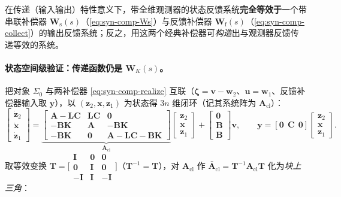 \begin{theorem}
\label{thm:syn-compensator-equiv}
在传递（输入输出）特性意义下，带全维观测器的状态反馈系统\textbf{完全等效于}一个带串联补偿器 $\mathbf W_{\mathrm s}(s)$（\cref{eq:syn-comp-Ws}）与反馈补偿器 $\mathbf W_{\mathrm f}(s)$（\cref{eq:syn-comp-collect}）的输出反馈系统；反之，用这两个经典补偿器可\emph{构造}出与观测器反馈传递等效的系统\cite{liubao2006modern}。
\end{theorem}

\paragraph{状态空间级验证：传递函数仍是 $\mathbf W_K(s)$。}
把对象 $\Sigma_0$ 与两补偿器 \cref{eq:syn-comp-realize} 互联（$\boldsymbol\zeta=\mathbf v-\mathbf w_2$、$\mathbf u=\mathbf w_1$、反馈补偿器输入取 $\mathbf y$），以 $(\mathbf z_2,\mathbf x,\mathbf z_1)$ 为状态得 $3n$ 维闭环（记其系统阵为 $\mathbf A_{\mathrm{cl}}$）：
\begin{equation}
  \begin{bmatrix}\dot{\mathbf z}_2\\\dot{\mathbf x}\\\dot{\mathbf z}_1\end{bmatrix}
  =\underbrace{\begin{bmatrix}\mathbf A-\mathbf L\mathbf C & \mathbf L\mathbf C & \mathbf 0\\ -\mathbf B\mathbf K & \mathbf A & -\mathbf B\mathbf K\\ -\mathbf B\mathbf K & \mathbf 0 & \mathbf A-\mathbf L\mathbf C-\mathbf B\mathbf K\end{bmatrix}}_{\mathbf A_{\mathrm{cl}}}
  \begin{bmatrix}\mathbf z_2\\\mathbf x\\\mathbf z_1\end{bmatrix}+\begin{bmatrix}\mathbf 0\\\mathbf B\\\mathbf B\end{bmatrix}\mathbf v,\qquad \mathbf y=[\mathbf 0\ \ \mathbf C\ \ \mathbf 0]\begin{bmatrix}\mathbf z_2\\\mathbf x\\\mathbf z_1\end{bmatrix}.
  \label{eq:syn-comp-aug}
\end{equation}
取等效变换 $\mathbf T=\big[\begin{smallmatrix}\mathbf I&\mathbf 0&\mathbf 0\\\mathbf 0&\mathbf I&\mathbf 0\\-\mathbf I&\mathbf I&-\mathbf I\end{smallmatrix}\big]$（$\mathbf T^{-1}=\mathbf T$），对 $\mathbf A_{\mathrm{cl}}$ 作 $\bar{\mathbf A}_{\mathrm{cl}}=\mathbf T^{-1}\mathbf A_{\mathrm{cl}}\mathbf T$ 化为\emph{块上三角}：
